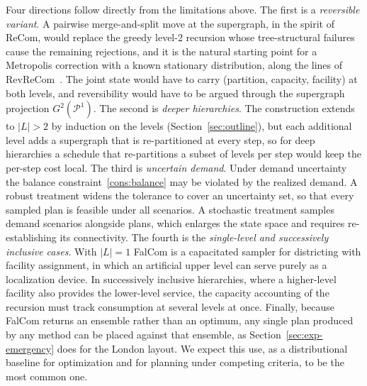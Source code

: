 \documentclass[preprint,12pt,authoryear]{elsarticle}
\theoremstyle{definition}
\begin{document}
Four directions follow directly from the limitations above. The first is a
\emph{reversible variant}. A pairwise merge-and-split move at the supergraph,
in the spirit of ReCom, would replace the greedy level-2 recursion whose
tree-structural failures cause the remaining rejections, and it is the natural
starting point for a Metropolis correction with a known stationary
distribution, along the lines of RevReCom~\citep{cannon2026spanning}. The
joint state would have to carry (partition, capacity, facility) at both
levels, and reversibility would have to be argued through the supergraph
projection $G^2(\mathcal{P}^1)$. The
second is \emph{deeper hierarchies}. The construction extends to $|L| > 2$ by
induction on the levels (Section~\ref{sec:outline}), but each additional level
adds a supergraph that is re-partitioned at every step, so for deep
hierarchies a schedule that re-partitions a subset of levels per step would
keep the per-step cost local. The third is \emph{uncertain demand}. Under
demand uncertainty the balance constraint~\eqref{cons:balance} may be violated by the realized demand. A robust treatment widens the tolerance to cover an uncertainty set, so that every sampled plan is feasible under all scenarios. A stochastic treatment samples demand scenarios alongside plans, which enlarges the state space and requires re-establishing its connectivity. The
fourth is the \emph{single-level and successively inclusive cases}. With
$|L| = 1$ FalCom is a capacitated sampler for districting with facility
assignment, in which an artificial upper level can serve purely as a localization device. In successively inclusive hierarchies, where a higher-level facility also provides the lower-level service, the capacity accounting of the recursion must track consumption at several levels at once. Finally, because FalCom returns an ensemble rather than an optimum, any
single plan produced by any method can be placed against that ensemble, as Section~\ref{sec:exp-emergency} does for the London layout. We expect this use, as a distributional baseline for optimization and for planning under competing criteria, to be the most common one.

\medskip





\newpage

\appendix\label{app}
\end{document}
